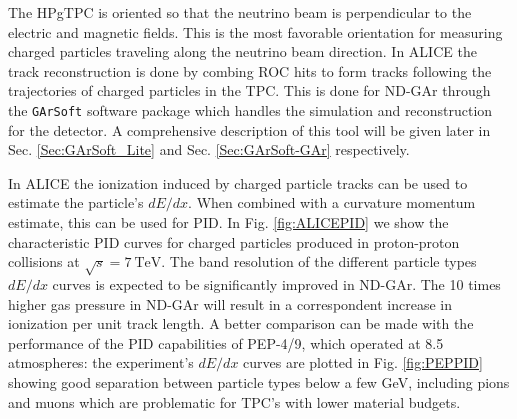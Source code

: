 The HPgTPC is oriented so that the neutrino beam is perpendicular to the electric and magnetic fields. This is the most favorable orientation for measuring charged particles traveling along the neutrino beam direction. In ALICE the track reconstruction is done by combing ROC hits to form tracks following the trajectories of charged particles in the TPC. This is done for ND-GAr through the \texttt{GArSoft} software package which handles the simulation and reconstruction for the detector. A comprehensive description of this tool will be given later in Sec. \ref{Sec:GArSoft_Lite} and Sec. \ref{Sec:GArSoft-GAr} respectively. 

In ALICE the ionization induced by charged particle tracks can be used to estimate the particle's $dE/dx$. When combined with a curvature momentum estimate, this can be used for PID. In Fig. \ref{fig:ALICEPID} we show the characteristic PID curves for charged particles produced in proton-proton collisions at $\sqrt{s}=7 \ \text{TeV}$. The band resolution of the different particle types $dE/dx$ curves is expected to be significantly improved in ND-GAr. The 10 times higher gas pressure in ND-GAr will result in a correspondent increase in ionization per unit track length. A better comparison can be made with the performance of the PID capabilities of PEP-4/9, which operated at 8.5 atmospheres: the experiment's $dE/dx$ curves are plotted in Fig. \ref{fig:PEPPID} showing good separation between particle types below a few GeV, including pions and muons which are problematic for TPC's with lower material budgets. 

